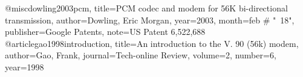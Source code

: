 @misc{dowling2003pcm,
  title={PCM codec and modem for 56K bi-directional transmission},
  author={Dowling, Eric Morgan},
  year={2003},
  month=feb # "~18",
  publisher={Google Patents},
  note={US Patent 6,522,688}
}
@article{gao1998introduction, 
  title={An introduction to the V. 90 (56k) modem}, 
  author={Gao, Frank}, 
  journal={Tech-online Review}, 
  volume={2}, 
  number={6}, 
  year={1998} 
}
